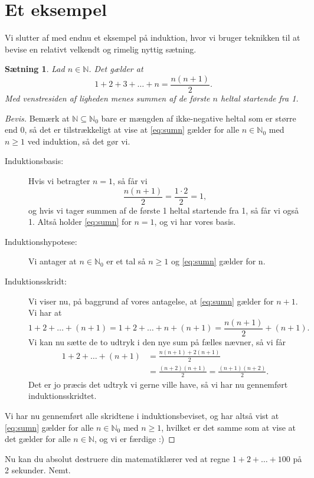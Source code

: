 \documentclass[a4paper, 12pt]{article}
\numberwithin{equation}{section}
\theoremstyle{plain}
\newtheorem{saetning}{Sætning}[section]
\theoremstyle{definition}
\newcommand{\N}{\mathbb{N}}
\begin{document}
\section{Et eksempel}
Vi slutter af med endnu et eksempel på induktion, hvor vi bruger teknikken til at bevise en relativt velkendt og rimelig nyttig sætning.
\begin{saetning}
  Lad \(n\in\N\). Det gælder at
  \begin{equation}\label{eq:sumn}
    1+2+3+\dots+n=\frac{n(n+1)}{2}.
  \end{equation}
  Med venstresiden af ligheden menes summen af de første \(n\) heltal startende fra 1.
\end{saetning}
\begin{proof}[Bevis]
Bemærk at \(\N\subseteq\N_0\) bare er mængden af ikke-negative heltal som er større end 0, så det er tilstrækkeligt at vise at \cref{eq:sumn} gælder for alle \(n\in\N_0\) med \(n\ge 1\) ved induktion, så det gør vi.
\begin{description}
\item[Induktionsbasis:] Hvis vi betragter \(n=1\), så får vi
  \[
    \frac{n(n+1)}{2}=\frac{1\cdot 2}{2}=1,
    \]
    og hvis vi tager summen af de første 1 heltal startende fra 1, så får vi også 1. Altså holder \cref{eq:sumn} for \(n=1\), og vi har vores basis.
  \item[Induktionshypotese:] Vi antager at \(n\in\N_0\) er et tal så \(n\ge 1\) og \cref{eq:sumn} gælder for n.
  \item[Induktionsskridt:] Vi viser nu, på baggrund af vores antagelse, at \cref{eq:sumn} gælder for \(n+1\). Vi har at
    \[
      1+2+\dots+(n+1)=1+2+\dots+n+(n+1)=\frac{n(n+1)}{2}+(n+1).
      \]
    Vi kan nu sætte de to udtryk i den nye sum på fælles nævner, så vi får
    \begin{align*}
      1+2+\dots+(n+1)&=\frac{n(n+1)+2(n+1)}{2}\\
      &=\frac{(n+2)(n+1)}{2}=\frac{(n+1)(n+2)}{2}.
    \end{align*}
    Det er jo præcis det udtryk vi gerne ville have, så vi har nu gennemført induktionsskridtet.
\end{description}
Vi har nu gennemført alle skridtene i induktionsbeviset, og har altså vist at \cref{eq:sumn} gælder for alle \(n\in\N_0\) med \(n\ge 1\), hvilket er det samme som at vise at det gælder for alle \(n\in\N\), og vi er færdige :)
\end{proof}
Nu kan du absolut destruere din matematiklærer ved at regne \(1+2+\dots+100\) på 2 sekunder. Nemt.
\end{document}
